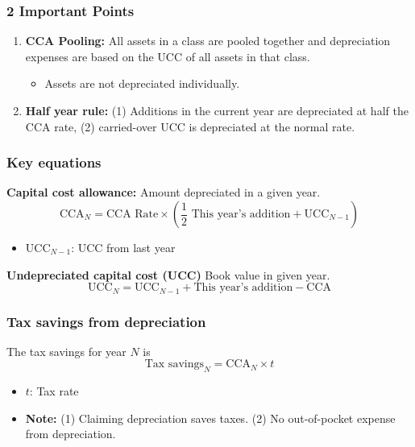 \subsubsection{2 Important Points}
\begin{definition}
    \begin{enumerate}
        \item \textbf{CCA Pooling:} All assets in a class are pooled together and depreciation expenses are based on the UCC of all assets in that class.
        \begin{itemize}
            \item Assets are not depreciated individually.
        \end{itemize}
        \item \textbf{Half year rule:} (1) Additions in the current year are depreciated at half the CCA rate, (2) carried-over UCC is depreciated at the normal rate.
    \end{enumerate}
\end{definition}

\subsubsection{Key equations}
\begin{definition} 
    \textbf{Capital cost allowance:} Amount depreciated in a given year.
    \begin{equation}
        \text{CCA}_N = \text{CCA Rate} \times \left( \frac{1}{2} \text{ This year's addition} + \text{UCC}_{N-1} \right)
    \end{equation}
    \begin{itemize}
        \item $ \text{UCC}_{N-1} $: UCC from last year
    \end{itemize}
    \vspace{1em}

    \textbf{Undepreciated capital cost (UCC)} Book value in given year.
    \begin{equation}
        \text{UCC}_N = \text{UCC}_{N-1} + \text{This year's addition} - \text{CCA}
    \end{equation}
\end{definition}

\subsubsection{Tax savings from depreciation}
\begin{definition}
    The tax savings for year $N$ is
    \begin{equation}
        \text{Tax savings}_N = \text{CCA}_N \times t 
    \end{equation}
    \begin{itemize}
        \item $t$: Tax rate
        \item \textbf{Note:} (1) Claiming depreciation saves taxes. (2) No out-of-pocket expense from depreciation.
    \end{itemize}

\end{definition}

